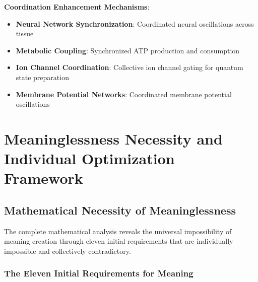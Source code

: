 ﻿\documentclass[11pt,a4paper]{article}
\begin{document}
\begin{itemize}
\begin{itemize}
\textbf{Coordination Enhancement Mechanisms}:
\begin{itemize}
\item \textbf{Neural Network Synchronization}: Coordinated neural oscillations across tissue
\item \textbf{Metabolic Coupling}: Synchronized ATP production and consumption
\item \textbf{Ion Channel Coordination}: Collective ion channel gating for quantum state preparation
\item \textbf{Membrane Potential Networks}: Coordinated membrane potential oscillations
\end{itemize}

\section{Meaninglessness Necessity and Individual Optimization Framework}

\subsection{Mathematical Necessity of Meaninglessness}

The complete mathematical analysis reveals the universal impossibility of meaning creation through eleven initial requirements that are individually impossible and collectively contradictory.

\subsubsection{The Eleven Initial Requirements for Meaning}


\end{itemize}
\end{itemize}
\end{document}
